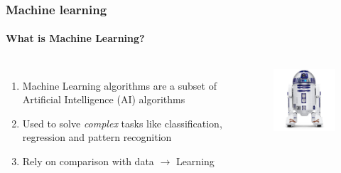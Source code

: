 \documentclass[aspectratio=43]{beamer}
\begin{document}
\begin{frame}
	
	\frametitle{Machine learning}
	\framesubtitle{What is Machine Learning?}
	
	\footnotesize
	
	\begin{columns}
		
		
		\begin{enumerate}
			\item Machine Learning algorithms are a subset of Artificial Intelligence (AI) algorithms 
			\item Used to solve \textit{complex} tasks like classification, regression and pattern recognition
			\item Rely on comparison with data $\longrightarrow$ {\color{red}Learning}
		\end{enumerate}
		
		
		\begin{figure}[!htb]
			\includegraphics[width = 4cm]{plots/section2/r2d2.jpeg}
		\end{figure}
		
	\end{columns}

\end{frame}
\end{document}
